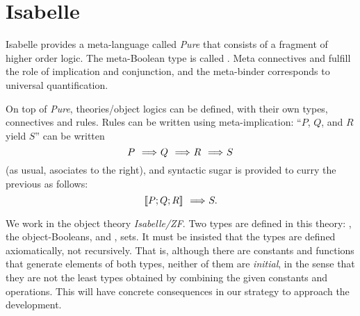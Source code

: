 \section{Isabelle}
Isabelle provides a meta-language called \emph{Pure} that consists of
a fragment of higher order logic. The meta-Boolean type is called
. Meta connectives
\isatt{\isasymLongrightarrow} and \isatt{\&\&\&} fulfill the role of
implication and conjunction, and the meta-binder \isatt{\isasymAnd}
corresponds to universal quantification. 

On top of \emph{Pure}, theories/object logics can be defined, with
their own types, connectives and rules. Rules can be written  using
meta-implication: ``$P$, $Q$, and $R$ yield $S$'' can be written
\[
P \ \isatt{\isasymLongrightarrow}\ Q\ \isatt{\isasymLongrightarrow}\ R\ \isatt{\isasymLongrightarrow}\ S
\]
(as usual,  \isatt{\isasymLongrightarrow} asociates to the right), and
syntactic sugar is provided to curry the previous as follows:
\[
\isasymlbrakk P; Q; R \isasymrbrakk \ \isatt{\isasymLongrightarrow}\ S.
\]

We work in the object theory \emph{Isabelle/ZF}. Two types are defined
in this theory: \tyo, the object-Booleans, and \tyi,
sets. It must be insisted that the types are defined axiomatically, not
recursively. That is, although there are constants and functions that
generate elements of both types, neither of them are 
\emph{initial}, in the sense that they are not the least types
obtained by combining the given constants and operations. This will
have concrete consequences in our strategy to approach the development.


